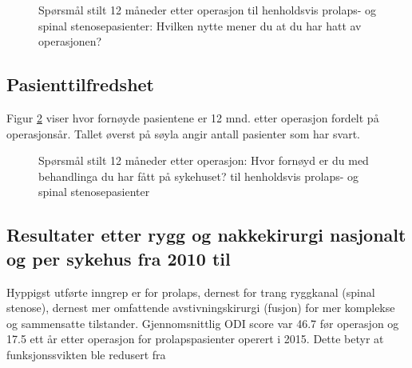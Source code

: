 \documentclass [norsk,a4paper,twoside]{article}\usepackage[]{graphicx}\usepackage[]{color}
\begin{document}
\begin{figure}[h] 
	\begin{center}
	\end{center}
  \caption{Spørsmål stilt 12 måneder etter operasjon til henholdsvis prolaps- og spinal stenosepasienter: Hvilken nytte mener du at du har hatt av operasjonen?}
  \label{fig:Nytte}
\end{figure}




\subsection{Pasienttilfredshet}

Figur \ref{fig:Fornoyd} viser hvor fornøyde pasientene er 12 mnd. 
etter operasjon fordelt på operasjonsår. Tallet øverst på søyla angir antall pasienter som har svart. 




\begin{figure}[h] 
	\begin{center}
	\end{center}
  \caption{Spørsmål stilt 12 måneder etter operasjon: Hvor fornøyd er du med behandlinga du har fått på sykehuset? til henholdsvis prolaps- og spinal stenosepasienter}
  \label{fig:Fornoyd}
\end{figure}



\subsection{ Resultater etter rygg og nakkekirurgi nasjonalt og per sykehus fra 2010 til }



Hyppigst utførte inngrep er for prolaps, dernest for trang ryggkanal (spinal stenose),
dernest mer omfattende avstivningskirurgi (fusjon) for mer komplekse og
sammensatte tilstander. 
Gjennomsnittlig ODI score var 46.7 før operasjon og 17.5 ett år etter
operasjon for prolapspasienter operert i 2015. Dette betyr at funksjonssvikten ble redusert fra 
 \\
\end{document}

